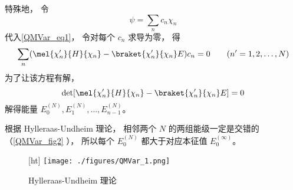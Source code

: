 特殊地， 令
\begin{equation}
\psi = \sum_n c_n \chi_n
\end{equation}
代入\autoref{QMVar_eq1}， 令对每个 $c_n$ 求导为零， 得
\begin{equation}
\sum_n (\mel{\chi_n'}{H}{\chi_n} - \braket{\chi_n'}{\chi_n}E)c_n = 0 \qquad (n' = 1,2,\dots,N)
\end{equation}
为了让该方程有解，
\begin{equation}
\det[\mel{\chi_n'}{H}{\chi_n} - \braket{\chi_n'}{\chi_n}E] = 0
\end{equation}
解得能量 $E_0^{(N)}, E_1^{(N)},\dots,E_{n-1}^{(N)}$。

根据 Hylleraas-Undheim 理论， 相邻两个 $N$ 的两组能级一定是交错的（\autoref{QMVar_fig2} ）， 所以每个 $E_0^{(N)}$ 都大于对应本征值 $E_0^{(\infty)}$。
\begin{figure}\label{QMVar_fig2}[ht]
\centering
\texttt{[image: ./figures/QMVar\_1.png]}
\caption{Hylleraas-Undheim 理论} \label{QMVar_fig1}
\end{figure}
